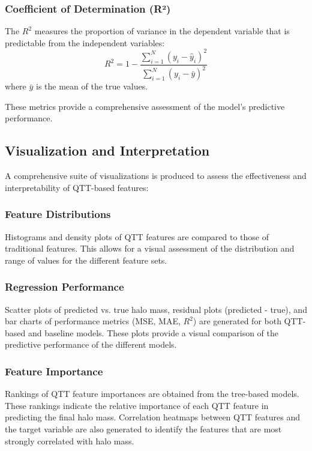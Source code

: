 \documentclass[twocolumn]{aastex631}
\begin{document}
\subsubsection{Coefficient of Determination (R²)}
The \(R^2\) measures the proportion of variance in the dependent variable that is predictable from the independent variables:
\[
R^2 = 1 - \frac{\sum_{i=1}^{N} (y_i - \hat{y}_i)^2}{\sum_{i=1}^{N} (y_i - \bar{y})^2}
\]
where \(\bar{y}\) is the mean of the true values.

These metrics provide a comprehensive assessment of the model's predictive performance.

\subsection{Visualization and Interpretation}

A comprehensive suite of visualizations is produced to assess the effectiveness and interpretability of QTT-based features:

\subsubsection{Feature Distributions}
Histograms and density plots of QTT features are compared to those of traditional features. This allows for a visual assessment of the distribution and range of values for the different feature sets.

\subsubsection{Regression Performance}
Scatter plots of predicted vs. true halo mass, residual plots (predicted - true), and bar charts of performance metrics (MSE, MAE, \(R^2\)) are generated for both QTT-based and baseline models. These plots provide a visual comparison of the predictive performance of the different models.

\subsubsection{Feature Importance}
Rankings of QTT feature importances are obtained from the tree-based models. These rankings indicate the relative importance of each QTT feature in predicting the final halo mass. Correlation heatmaps between QTT features and the target variable are also generated to identify the features that are most strongly correlated with halo mass.
\end{document}
